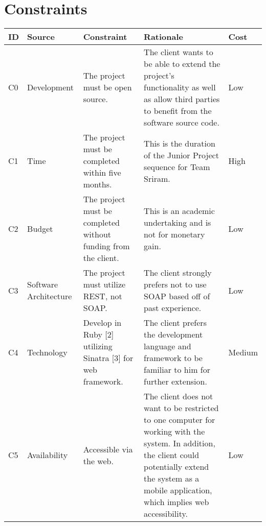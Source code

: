 \documentclass{article}
\begin{document}
\section{Constraints}
\begin{tabular}{ | p{0.15in} | p{0.75in} | p{1.8in} | p{2.3in} | p{0.5in} | }
\hline
\textbf{ID} & \textbf{Source} & \textbf{Constraint} & \textbf{Rationale} & \textbf{Cost}\\
\hline
\hline
C0 & Development & The project must be open source. & The client wants to be able to extend the project's functionality as well as allow third parties to benefit from the software source code. & Low \\
\hline
C1 & Time & The project must be completed within five months. & This is the duration of the Junior Project sequence for Team Sriram. & High \\
\hline
C2 & Budget & The project must be completed without funding from the client. & This is an academic undertaking and is not for monetary gain. & Low \\
\hline
C3 & Software Architecture & The project must utilize REST, not SOAP. & The client strongly prefers not to use SOAP based off of past experience. & Low \\
\hline
C4 & Technology & Develop in Ruby [2] utilizing Sinatra [3] for web framework. & The client prefers the development language and framework to be familiar to him for further extension. & Medium \\
\hline
C5 & Availability & Accessible via the web. & The client does not want to be restricted to one computer for working with the system.  In addition, the client could potentially extend the system as a mobile application, which implies web accessibility. & Low\\
\hline
\end{tabular}
\end{document}

